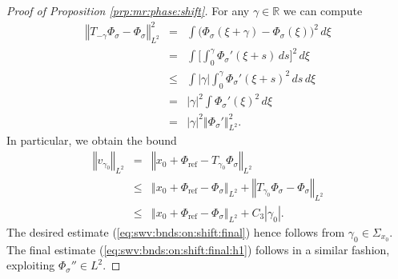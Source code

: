 \documentclass[10pt]{articleHJ}
\newcommand{\Real}{\mathbb{R}}							%
\newcommand{\abs}[1]{\left\vert#1\right\vert}			%
\newcommand{\norm}[1]{\left\Vert#1\right\Vert}		%
\newcommand{\sref}[1]{(\ref{#1})}                       %
\numberwithin{equation}{section}
\begin{document}
\begin{proof}[Proof of Proposition \ref{prp:mr:phase:shift}]
For any $\gamma \in \Real$ we can compute
\begin{equation}
\begin{array}{lcl}
\norm{T_{-\gamma} \Phi_{\sigma} - \Phi_{\sigma}}^2_{L^2}
& = &
\int \big(  \Phi_{\sigma}(\xi + \gamma) - \Phi_{\sigma}(\xi) \big)^2 \, d \xi
\\[0.2cm]
& = &
\int \big[ \int_0^{\gamma} \Phi_{\sigma}'(\xi + s) \, ds \big]^2 \, d \xi
\\[0.2cm]
& \le &
\int \abs{\gamma} \int_0^{\gamma} \Phi_{\sigma}'(\xi + s)^2 \, ds \, d \xi
\\[0.2cm]
& = &
\abs{\gamma}^2  \int \Phi_{\sigma}'(\xi)^2 \, d \xi
\\[0.2cm]
& = & \abs{\gamma}^2  \norm{\Phi_{\sigma}'}^2_{L^2}.
\end{array}
\end{equation}
In particular, we obtain the bound
\begin{equation}
\begin{array}{lcl}
\norm{v_{\gamma_0}}_{L^2}
& = &
 \norm{ x_0 + \Phi_{\mathrm{ref}}
   - T_{\gamma_0} \Phi_{\sigma} }_{L^2}
\\[0.2cm]
& \le &
  \norm{ x_0 + \Phi_{\mathrm{ref}}
   -  \Phi_{\sigma} }_{L^2}
   + \norm{ T_{\gamma_0} \Phi_{\sigma}
     - \Phi_{\sigma} }_{L^2}
\\[0.2cm]
& \le &
  \norm{ x_0 + \Phi_{\mathrm{ref}}
   -  \Phi_{\sigma} }_{L^2}
  + C_3 \abs{ \gamma_0 }.
\end{array}
\end{equation}
The desired estimate \sref{eq:swv:bnds:on:shift:final}
hence follows from $\gamma_0 \in \Sigma_{x_0}$.
The final estimate \sref{eq:swv:bnds:on:shift:final:h1}
follows in a similar fashion, exploiting $\Phi_{\sigma}'' \in L^2$.
\end{proof}
\end{document}
